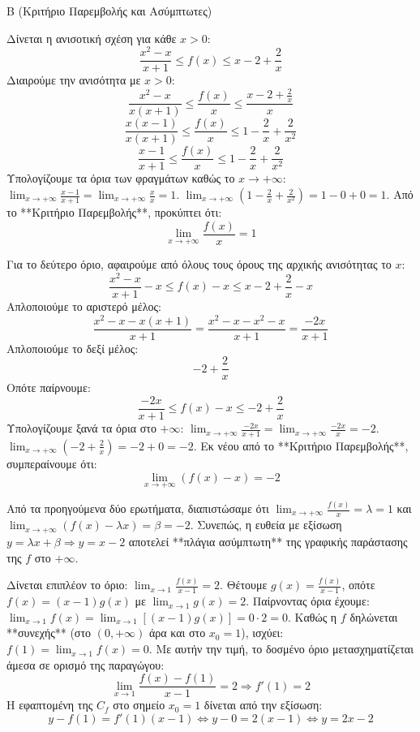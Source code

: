 \begin{thema}{Β}
(Κριτήριο Παρεμβολής και Ασύμπτωτες)
\begin{erwthma}
\item Δίνεται η ανισοτική σχέση για κάθε $x > 0$:
\[ \frac{x^2 - x}{x+1} \le f(x) \le x - 2 + \frac{2}{x} \]
Διαιρούμε την ανισότητα με $x > 0$:
\[ \frac{x^2 - x}{x(x+1)} \le \frac{f(x)}{x} \le \frac{x - 2 + \frac{2}{x}}{x} \]
\[ \frac{x(x - 1)}{x(x+1)} \le \frac{f(x)}{x} \le 1 - \frac{2}{x} + \frac{2}{x^2} \]
\[ \frac{x - 1}{x+1} \le \frac{f(x)}{x} \le 1 - \frac{2}{x} + \frac{2}{x^2} \]
Υπολογίζουμε τα όρια των φραγμάτων καθώς το $x \to +\infty$:
$\lim_{x\to+\infty} \frac{x - 1}{x+1} = \lim_{x\to+\infty} \frac{x}{x} = 1$.
$\lim_{x\to+\infty} \left( 1 - \frac{2}{x} + \frac{2}{x^2} \right) = 1 - 0 + 0 = 1$.
Από το **Κριτήριο Παρεμβολής**, προκύπτει ότι:
\[ \lim_{x\to+\infty} \frac{f(x)}{x} = 1 \]

\item Για το δεύτερο όριο, αφαιρούμε από όλους τους όρους της αρχικής ανισότητας το $x$:
\[ \frac{x^2 - x}{x+1} - x \le f(x) - x \le x - 2 + \frac{2}{x} - x \]
Απλοποιούμε το αριστερό μέλος:
\[ \frac{x^2 - x - x(x+1)}{x+1} = \frac{x^2 - x - x^2 - x}{x+1} = \frac{-2x}{x+1} \]
Απλοποιούμε το δεξί μέλος:
\[ -2 + \frac{2}{x} \]
Οπότε παίρνουμε:
\[ \frac{-2x}{x+1} \le f(x) - x \le -2 + \frac{2}{x} \]
Υπολογίζουμε ξανά τα όρια στο $+\infty$:
$\lim_{x\to+\infty} \frac{-2x}{x+1} = \lim_{x\to+\infty} \frac{-2x}{x} = -2$.
$\lim_{x\to+\infty} \left( -2 + \frac{2}{x} \right) = -2 + 0 = -2$.
Εκ νέου από το **Κριτήριο Παρεμβολής**, συμπεραίνουμε ότι:
\[ \lim_{x\to+\infty} (f(x) - x) = -2 \]

\item Από τα προηγούμενα δύο ερωτήματα, διαπιστώσαμε ότι $\lim_{x\to+\infty} \frac{f(x)}{x} = \lambda = 1$ και $\lim_{x\to+\infty} (f(x) - \lambda x) = \beta = -2$.
Συνεπώς, η ευθεία με εξίσωση $y = \lambda x + \beta \Rightarrow y = x - 2$ αποτελεί **πλάγια ασύμπτωτη** της γραφικής παράστασης της $f$ στο $+\infty$.

\item Δίνεται επιπλέον το όριο: $\lim_{x\to1} \frac{f(x)}{x-1} = 2$.
Θέτουμε $g(x) = \frac{f(x)}{x-1}$, οπότε $f(x) = (x-1)g(x)$ με $\lim_{x\to1} g(x) = 2$.
Παίρνοντας όρια έχουμε: $\lim_{x\to1} f(x) = \lim_{x\to1} [(x-1)g(x)] = 0 \cdot 2 = 0$.
Καθώς η $f$ δηλώνεται **συνεχής** (στο $(0, +\infty)$ άρα και στο $x_0=1$), ισχύει: $f(1) = \lim_{x\to1} f(x) = 0$.
Με αυτήν την τιμή, το δοσμένο όριο μετασχηματίζεται άμεσα σε ορισμό της παραγώγου:
\[ \lim_{x\to1} \frac{f(x) - f(1)}{x-1} = 2 \Rightarrow f'(1) = 2 \]
Η εφαπτομένη της $C_f$ στο σημείο $x_0=1$ δίνεται από την εξίσωση:
\[ y - f(1) = f'(1)(x - 1) \Leftrightarrow y - 0 = 2(x - 1) \Leftrightarrow y = 2x - 2 \]
\end{erwthma}
\end{thema}

